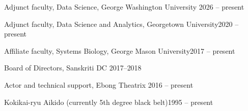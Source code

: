 Adjunct faculty, Data Science, George Washington University 	\hfill 2026 -- present
 
Adjunct faculty, Data Science and Analytics, Georgetown University\hfill 2020 -- present

Affiliate faculty, Systems Biology, George Mason University\hfill 2017 -- present

Board of Directors, Sanskriti DC	\hfill 2017--2018

Actor and technical support, Ebong Theatrix \hfill 2016 -- present

Kokikai-ryu Aikido (currently 5th degree black belt)\hfill 1995 -- present



